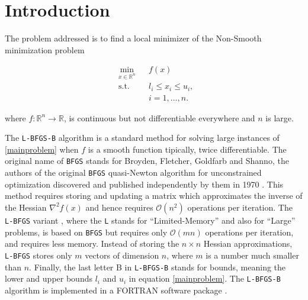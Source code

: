 
\chapter{Introduction} %

\label{Chapter1} %


The problem addressed is to find a local minimizer of the Non-Smooth minimization problem

\begin{equation} \label{mainproblem}
  \begin{aligned}
    & \underset{x \in \mathbb{R}^n}{\text{min}}
    & & f(x) \\
    & \text{s.t.}
    & & l_i \leq x_i \leq u_i , \; \\
    & & & i = 1, \ldots, n.
  \end{aligned}
\end{equation}

where $f \colon \mathbb{R}^n \to \mathbb{R}$, is continuous but not differentiable everywhere and $n$ is large.

The \texttt{L-BFGS-B} algorithm \citep{lbfgsboriginal} is a standard method for solving large instances of \eqref{mainproblem} when $f$ is a smooth function tipically, twice differentiable. The original name of \texttt{BFGS} stands for Broyden, Fletcher, Goldfarb and Shanno, the authors
of the original \texttt{BFGS} quasi-Newton algorithm for unconstrained
optimization discovered and published
independently by them in 1970 \citep{Broyden, Fletcher, Goldfarb, Shanno}.
This method requires storing and updating a matrix which 
approximates the inverse of the Hessian $\nabla^2 f(x)$ and
hence requires $\mathcal{O}(n^2)$ operations per iteration.  
The \texttt{L-BFGS} variant \citep{MR572855}, where the \texttt{L} stands for ``Limited-Memory'' and also for ``Large'' problems, is based on \texttt{BFGS} but requires only $\mathcal{O}(mn)$ operations per iteration, and requires less memory. Instead of storing the $n \times n$ Hessian approximations, \texttt{L-BFGS} stores only $m$ vectors of dimension $n$, where $m$ is a number much smaller than $n$. Finally, the last letter B in 
\texttt{L-BFGS-B} stands for bounds, meaning the lower and upper
bounds $l_i$ and $u_i$ in equation \eqref{mainproblem}.  The \texttt{L-BFGS-B} algorithm is implemented in a FORTRAN software package \citep{lbfgsbsoftware}.

